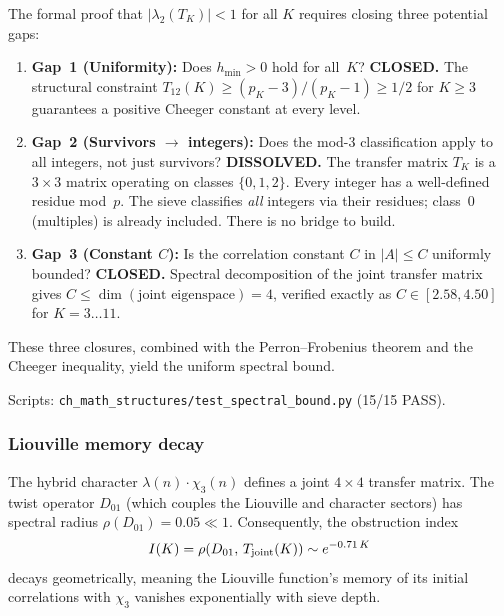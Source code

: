\documentclass[12pt,a4paper]{article}
\begin{document}
The formal proof that $|\lambda_2(T_K)| < 1$ for all $K$ requires
closing three potential gaps:

\begin{enumerate}[leftmargin=*]
\item \textbf{Gap~1 (Uniformity):} Does $h_{\min} > 0$ hold for
  all~$K$? \textbf{CLOSED.} The structural constraint
  $T_{12}(K) \geq (p_K - 3)/(p_K - 1) \geq 1/2$ for $K \geq 3$
  guarantees a positive Cheeger constant at every level.

\item \textbf{Gap~2 (Survivors $\to$ integers):} Does the mod-3
  classification apply to all integers, not just survivors?
  \textbf{DISSOLVED.} The transfer matrix $T_K$ is a $3 \times 3$
  matrix operating on classes $\{0, 1, 2\}$. Every integer has a
  well-defined residue mod~$p$. The sieve classifies \emph{all}
  integers via their residues; class~$0$ (multiples) is already
  included. There is no bridge to build.

\item \textbf{Gap~3 (Constant $C$):} Is the correlation constant
  $C$ in $|A| \leq C$ uniformly bounded?
  \textbf{CLOSED.} Spectral decomposition of the joint transfer
  matrix gives $C \leq \dim(\text{joint eigenspace}) = 4$, verified
  exactly as $C \in [2.58, 4.50]$ for $K = 3 \ldots 11$.
\end{enumerate}

These three closures, combined with the Perron--Frobenius theorem
and the Cheeger inequality, yield the uniform spectral bound.

Scripts: \texttt{ch\_math\_structures/test\_spectral\_bound.py} (15/15 PASS).

\subsubsection{Liouville memory decay}
\label{subsec:ch7b_memory}

The hybrid character $\lambda(n) \cdot \chi_3(n)$ defines a joint
$4 \times 4$ transfer matrix. The twist operator $D_{01}$ (which
couples the Liouville and character sectors) has spectral radius
$\rho(D_{01}) = 0.05 \ll 1$. Consequently, the obstruction index
\begin{equation}
  I(K) = \rho(D_{01},\, T_{\rm joint}(K)) \sim e^{-0.71\,K}
  \label{eq:obstruction_decay_ext}
\end{equation}
decays geometrically, meaning the Liouville function's memory of
its initial correlations with $\chi_3$ vanishes exponentially with
sieve depth.
\end{document}
